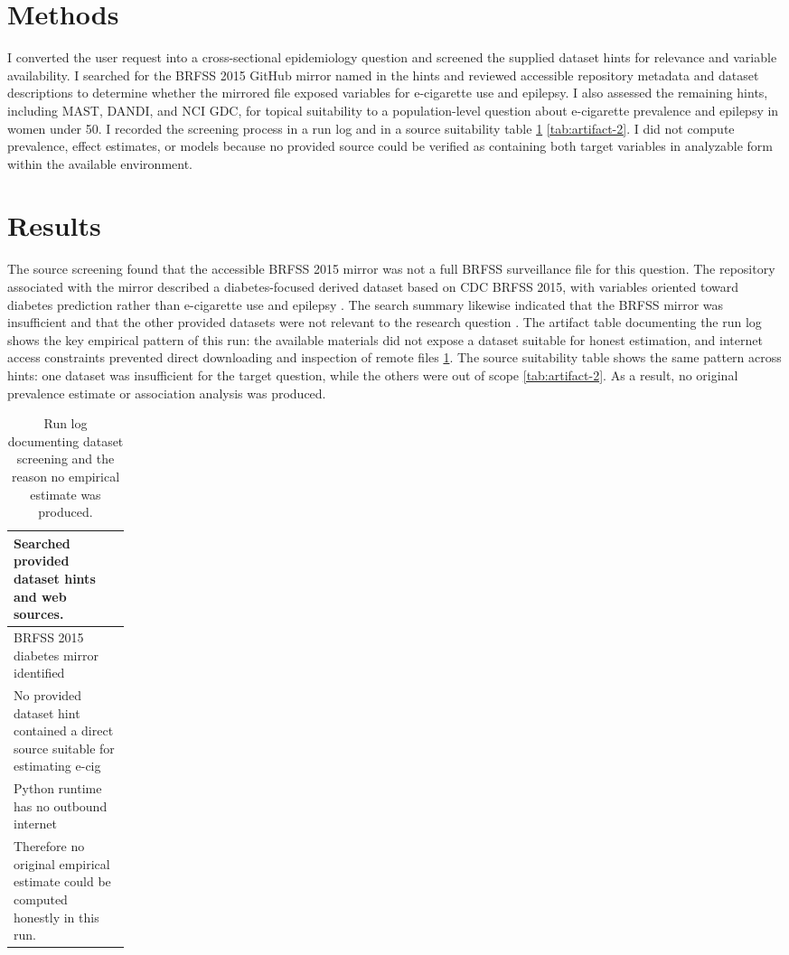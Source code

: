 \documentclass[11pt]{article}
\begin{document}
\section{Methods}
I converted the user request into a cross-sectional epidemiology question and screened the supplied dataset hints for relevance and variable availability. I searched for the BRFSS 2015 GitHub mirror named in the hints and reviewed accessible repository metadata and dataset descriptions to determine whether the mirrored file exposed variables for e-cigarette use and epilepsy. I also assessed the remaining hints, including MAST, DANDI, and NCI GDC, for topical suitability to a population-level question about e-cigarette prevalence and epilepsy in women under 50. I recorded the screening process in a run log and in a source suitability table \ref{tab:artifact-1} \ref{tab:artifact-2}. I did not compute prevalence, effect estimates, or models because no provided source could be verified as containing both target variables in analyzable form within the available environment.

\section{Results}
The source screening found that the accessible BRFSS 2015 mirror was not a full BRFSS surveillance file for this question. The repository associated with the mirror described a diabetes-focused derived dataset based on CDC BRFSS 2015, with variables oriented toward diabetes prediction rather than e-cigarette use and epilepsy \cite{ref1}. The search summary likewise indicated that the BRFSS mirror was insufficient and that the other provided datasets were not relevant to the research question \cite{ref2}. The artifact table documenting the run log shows the key empirical pattern of this run: the available materials did not expose a dataset suitable for honest estimation, and internet access constraints prevented direct downloading and inspection of remote files \ref{tab:artifact-1}. The source suitability table shows the same pattern across hints: one dataset was insufficient for the target question, while the others were out of scope \ref{tab:artifact-2}. As a result, no original prevalence estimate or association analysis was produced.

\begin{table}[tbp]
\centering
\caption{Run log documenting dataset screening and the reason no empirical estimate was produced.}
\label{tab:artifact-1}
\begin{tabular}{>{\raggedright\arraybackslash}p{0.15\linewidth}}
\toprule
Searched provided dataset hints and web sources. \\
\midrule
BRFSS 2015 diabetes mirror identified \\
No provided dataset hint contained a direct source suitable for estimating e-cig \\
Python runtime has no outbound internet \\
Therefore no original empirical estimate could be computed honestly in this run. \\
\bottomrule
\end{tabular}
\end{table}
\end{document}
